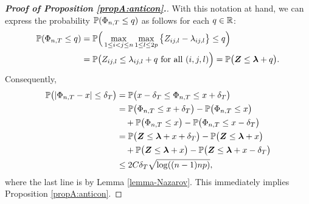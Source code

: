 \documentclass[12pt]{article}
\begin{document}
\begin{proof}[\textnormal{\textbf{Proof of Proposition \ref{propA:anticon}.}}]
With this notation at hand, we can express the probability $\mathbb{P}(\Phi_{n,T} \le q)$ as follows for each $q \in \mathbb{R}$: 
\begin{align*} 
\mathbb{P}(\Phi_{n,T} \le q) 
 & = \mathbb{P} \Big( \max_{1\leq i< j \leq n}\max_{1 \le l \le 2p} \big\{ Z_{ij,l} - \lambda_{ij,l} \big\} \le q \Big) \\
 & = \mathbb{P} \big( Z_{ij,l} \le \lambda_{ij,l} + q \text{ for all } (i,j,l) \Big) 
   = \mathbb{P} \big( \boldsymbol{Z} \le \boldsymbol{\lambda} + q \big). 
\end{align*}
Consequently,
\begin{align*}
\mathbb{P}\big( |\Phi_{n,T} - x| \le \delta_T \big) 
 & = \mathbb{P} \big( x - \delta_T \le \Phi_{n,T} \le x + \delta_T \big) \\
 & = \mathbb{P} \big( \Phi_{n,T} \le x + \delta_T \big) - \mathbb{P} \big( \Phi_{n,T} \le x \big) \\
 & \quad + \mathbb{P} \big( \Phi_{n,T} \le x \big) - \mathbb{P} \big( \Phi_{n,T} \le x - \delta_T \big) \\
 & = \mathbb{P} \big( \boldsymbol{Z} \le \boldsymbol{\lambda} + x + \delta_T \big) - \mathbb{P} \big( \boldsymbol{Z} \le \boldsymbol{\lambda} + x \big) \\
 & \quad + \mathbb{P} \big( \boldsymbol{Z} \le \boldsymbol{\lambda} + x \big) - \mathbb{P} \big( \boldsymbol{Z} \le \boldsymbol{\lambda} + x - \delta_T\big) \\
 & \le 2 C \delta_T \sqrt{\log((n-1)np)},
\end{align*} 
where the last line is by Lemma \ref{lemma-Nazarov}. This immediately implies Proposition \ref{propA:anticon}.
\end{proof}
\end{document}
